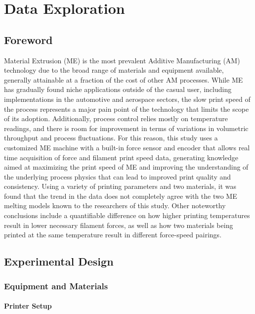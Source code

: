 \documentclass[main.tex]{subfiles}
\begin{document}
\chapter{Data Exploration} \label{ch:data_ex}
\section{Foreword} \label{sec:fw_dataex}

Material Extrusion (ME) is the most prevalent Additive Manufacturing (AM) technology due to the broad range of materials and equipment available, generally attainable at a fraction of the cost of other AM processes. While ME has gradually found niche applications outside of the casual user, including implementations in the automotive and aerospace sectors, the slow print speed of the process represents a major pain point of the technology that limits the scope of its adoption. Additionally, process control relies mostly on temperature readings, and there is room for improvement in terms of variations in volumetric throughput and process fluctuations. For this reason, this study uses a customized ME machine with a built-in force sensor and encoder that allows real time acquisition of force and filament print speed data, generating knowledge aimed at maximizing the print speed of ME and improving the understanding of the underlying process physics that can lead to improved print quality and consistency. Using a variety of printing parameters and two materials, it was found that the trend in the data does not completely agree with the two ME melting models known to the researchers of this study. Other noteworthy conclusions include a quantifiable difference on how higher printing temperatures result in lower necessary filament forces, as well as how two materials being printed at the same temperature result in different force-speed pairings.

\section{Experimental Design} \label{sec:doe_data}
\subsection{Equipment and Materials} \label{ssec:mat_data}
\subsubsection{Printer Setup} \label{sssec:printer}
\end{document}

